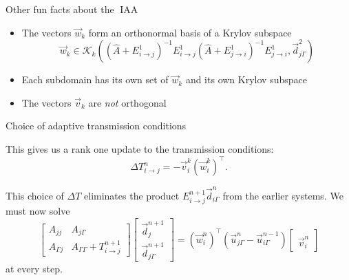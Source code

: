 \documentclass{beamer}
\DeclareMathOperator{\iaa}{IAA} %
\begin{document}
\begin{frame}{Other fun facts about the $\iaa$}

\begin{itemize}
\item The vectors $\vec{w}_k$ form an orthonormal basis of a Krylov subspace
\begin{equation*}
	\vec{w}_k \in \mathcal{K}_k \left ( \left ( \hat{A} + E_{i \to j}^{1} \right )^{-1} E_{i \to j}^{1} \left ( \hat{A} + E_{j \to i}^{1} \right )^{-1} E_{j \to i}^{1}, \vec{d}_{j \Gamma}^2 \right )
\end{equation*}
\item Each subdomain has its own set of $\vec{w}_k$ and its own Krylov subspace
\item The vectors $\vec{v}_k$ are \textit{not} orthogonal
\end{itemize}
\end{frame}

\begin{frame}{Choice of adaptive transmission conditions}

This gives us a rank one update to the transmission conditions:
\begin{equation*}
	\Delta T_{i \to j}^n = - \vec{v}_i^k \left ( \vec{w}_i^k \right )^\top.
\end{equation*}

This choice of $\Delta T$ eliminates the product $E_{i \to j}^{n+1} \vec{d}_{i \Gamma}^n$ from the earlier systems.
We must now solve
\begin{equation*}
	\begin{bmatrix} A_{jj} & A_{j \Gamma} \\ A_{\Gamma j} & A_{\Gamma \Gamma} + T_{i \to j}^{n+1} \end{bmatrix}
	\begin{bmatrix} \vec{d}_j^{n+1} \\ \vec{d}_{j \Gamma}^{n+1} \end{bmatrix}
	= (\vec{w}_i^n)^\top \left ( \vec{u}_{j \Gamma}^n - \vec{u}_{i \Gamma}^{n-1} \right )\begin{bmatrix} ~ \\ \vec{v}_i^n \end{bmatrix}
\end{equation*}
at every step.
\end{frame}
\end{document}
